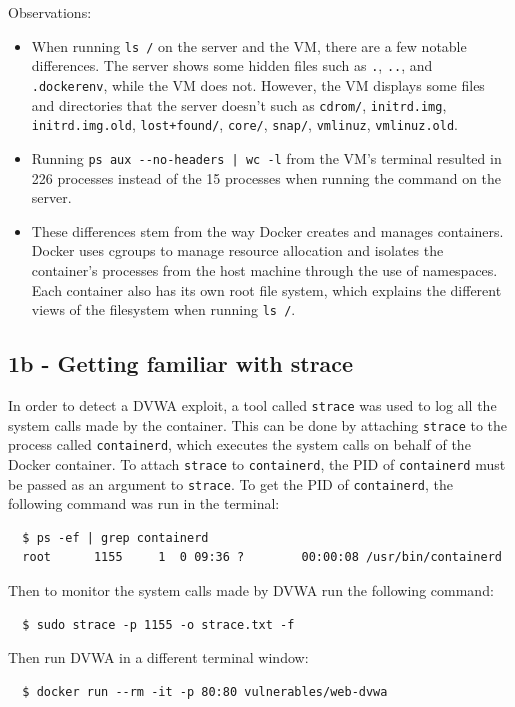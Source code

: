 \documentclass[11pt]{article}
\begin{document}
\noindent Observations:
\begin{itemize}
  \item When running \verb|ls /| on the server and the VM, there are a few notable differences. The server shows some hidden files
  such as \verb|.|, \verb|..|, and \verb|.dockerenv|, while the VM does not. However, the VM displays some files and directories that the server doesn't such as
  \verb|cdrom/|, \verb|initrd.img|, \verb|initrd.img.old|, \verb|lost+found/|, \verb|core/|, \verb|snap/|, \verb|vmlinuz|, \verb|vmlinuz.old|.
  \item Running \verb=ps aux --no-headers | wc -l= from the VM's terminal resulted in 226 processes instead of the 15 processes when running the command on the server.
  \item These differences stem from the way Docker creates and manages containers. Docker uses cgroups to manage resource allocation
  and isolates the container's processes from the host machine through the use of namespaces.
  Each container also has its own root file system, which explains the different views of the filesystem when running \verb|ls /|.~\cite{codementor,demystify}
\end{itemize}

\subsection*{1b - Getting familiar with strace}
In order to detect a DVWA exploit, a tool called \verb|strace| was used to log all the system calls made by the container.
This can be done by attaching \verb|strace| to the process called \verb|containerd|, which executes the system calls on behalf of the Docker container.
To attach \verb|strace| to \verb|containerd|, the PID of \verb|containerd| must be passed as an argument to \verb|strace|.
\noindent To get the PID of \verb|containerd|, the following command was run in the terminal:
\begin{verbatim}
  $ ps -ef | grep containerd
  root      1155     1  0 09:36 ?        00:00:08 /usr/bin/containerd
\end{verbatim}
\noindent Then to monitor the system calls made by DVWA run the following command:
\begin{verbatim}
  $ sudo strace -p 1155 -o strace.txt -f
\end{verbatim}
\noindent Then run DVWA in a different terminal window:
\begin{verbatim}
  $ docker run --rm -it -p 80:80 vulnerables/web-dvwa
\end{verbatim}
\end{document}
